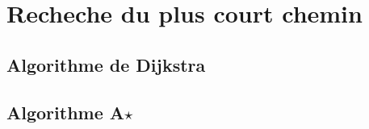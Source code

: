 \section{Recheche du plus court chemin}
\subsection{Algorithme de Dijkstra}

\subsection{Algorithme A$\star$}

\begin{defi}{}
\end{defi}

\begin{defi}{}
\end{defi}

\begin{defi}{}
\end{defi}

\begin{defi}{}
\end{defi}

\begin{defi}{}
\end{defi}
